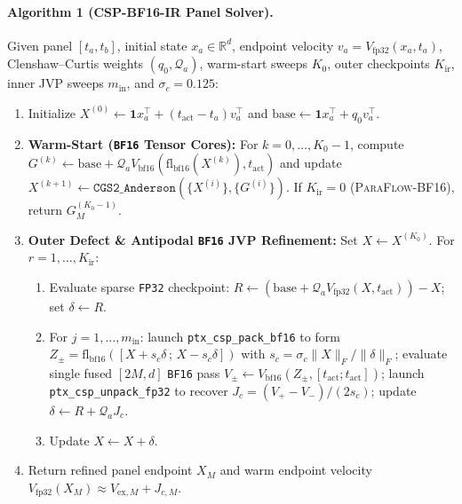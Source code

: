 \documentclass[11pt,a4paper]{article}
\theoremstyle{definition}
\theoremstyle{remark}
\newcommand{\bfsixteen}{\texttt{BF16}}
\newcommand{\fpthirtytwo}{\texttt{FP32}}
\begin{document}
\paragraph{Algorithm 1 (\textsc{CSP-BF16-IR} Panel Solver).}
Given panel $[t_a, t_b]$, initial state $x_a \in \mathbb{R}^d$, endpoint velocity $v_a = V_{\mathrm{fp32}}(x_a, t_a)$, Clenshaw--Curtis weights $(q_0, \mathcal{Q}_a)$, warm-start sweeps $K_0$, outer checkpoints $K_{\mathrm{ir}}$, inner JVP sweeps $m_{\mathrm{in}}$, and $\sigma_c = 0.125$:
\begin{enumerate}[leftmargin=1.8em,itemsep=2pt]
    \item Initialize $X^{(0)} \leftarrow \mathbf{1} x_a^\top + (t_{\mathrm{act}} - t_a) v_a^\top$ and $\mathrm{base} \leftarrow \mathbf{1} x_a^\top + q_0 v_a^\top$.
    \item \textbf{Warm-Start (\bfsixteen{} Tensor Cores):} For $k = 0,\dots,K_0-1$, compute $G^{(k)} \leftarrow \mathrm{base} + \mathcal{Q}_a V_{\mathrm{bf16}}(\mathrm{fl}_{\mathrm{bf16}}(X^{(k)}), t_{\mathrm{act}})$ and update $X^{(k+1)} \leftarrow \texttt{CGS2\_Anderson}(\{X^{(i)}\}, \{G^{(i)}\})$. If $K_{\mathrm{ir}} = 0$ (\textsc{ParaFlow-BF16}), return $G^{(K_0-1)}_{M}$.
    \item \textbf{Outer Defect \& Antipodal \bfsixteen{} JVP Refinement:} Set $X \leftarrow X^{(K_0)}$. For $r = 1,\dots,K_{\mathrm{ir}}$:
    \begin{enumerate}[leftmargin=1.5em,itemsep=1pt]
        \item Evaluate sparse \fpthirtytwo{} checkpoint: $R \leftarrow (\mathrm{base} + \mathcal{Q}_a V_{\mathrm{fp32}}(X, t_{\mathrm{act}})) - X$; set $\delta \leftarrow R$.
        \item For $j = 1,\dots,m_{\mathrm{in}}$: launch \texttt{ptx\_csp\_pack\_bf16} to form $Z_{\pm} = \mathrm{fl}_{\mathrm{bf16}}([X + s_c \delta \,;\, X - s_c \delta])$ with $s_c = \sigma_c \|X\|_F / \|\delta\|_F$; evaluate single fused $[2M, d]$ \bfsixteen{} pass $V_{\pm} \leftarrow V_{\mathrm{bf16}}(Z_{\pm}, [t_{\mathrm{act}}; t_{\mathrm{act}}])$; launch \texttt{ptx\_csp\_unpack\_fp32} to recover $J_c = (V_+ - V_-)/(2s_c)$; update $\delta \leftarrow R + \mathcal{Q}_a J_c$.
        \item Update $X \leftarrow X + \delta$.
    \end{enumerate}
    \item Return refined panel endpoint $X_M$ and warm endpoint velocity $V_{\mathrm{fp32}}(X_M) \approx V_{\mathrm{ex}, M} + J_{c, M}$.
\end{enumerate}
\end{document}
